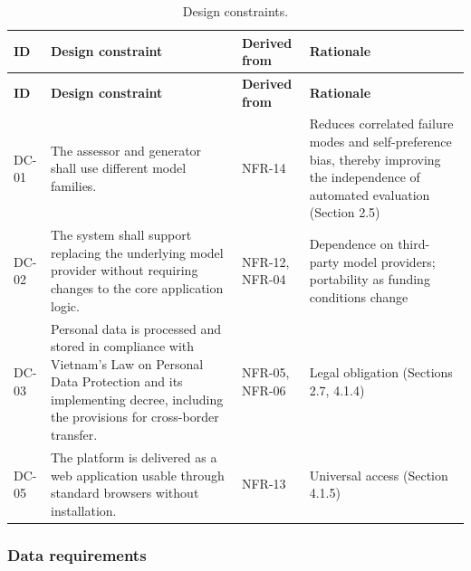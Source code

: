 {\small
\begin{longtable}{|>{\raggedright\arraybackslash}p{}|>{\raggedright\arraybackslash}p{}|>{\raggedright\arraybackslash}p{}|>{\raggedright\arraybackslash}p{}|}
\caption{Design constraints.} \\
\hline
\textbf{ID} & \textbf{Design constraint} & \textbf{Derived from} & \textbf{Rationale} \\ \hline
\endfirsthead
\hline
\textbf{ID} & \textbf{Design constraint} & \textbf{Derived from} & \textbf{Rationale} \\ \hline
\endhead
DC-01 & The assessor and generator shall use different model families. & NFR-14 & Reduces correlated failure modes and self-preference bias, thereby improving the independence of automated evaluation (Section 2.5) \\ \hline
DC-02 & The system shall support replacing the underlying model provider without requiring changes to the core application logic. & NFR-12, NFR-04 & Dependence on third-party model providers; portability as funding conditions change \\ \hline
DC-03 & Personal data is processed and stored in compliance with Vietnam's Law on Personal Data Protection and its implementing decree, including the provisions for cross-border transfer. & NFR-05, NFR-06 & Legal obligation (Sections 2.7, 4.1.4) \\ \hline
DC-05 & The platform is delivered as a web application usable through standard browsers without installation. & NFR-13 & Universal access (Section 4.1.5) \\ \hline
\end{longtable}
}

\subsubsection{Data requirements}

